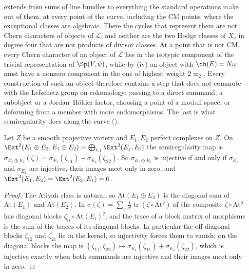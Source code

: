 \begin{remark}
\label{rem:leavel}
 extends  from sums of
line bundles to everything the standard operations make out of them, at every
point of the curve, including the CM points, where the exceptional classes
are algebraic. There the cycles that represent them are not Chern characters
of objects of $\mathcal{L}$, and neither are the two Hodge classes of $X_{c}$
in degree four that are not products of divisor classes. At a point that is
not CM, every Chern character of an object of $\mathcal{L}$ lies in the
isotypic component of the trivial representation of $\Sp(V,\psi)$, while by
(iv) an object with $\ch(E)=N\omega$ must have a
nonzero component in the one of highest weight $2\varpi_{2}$. Every
construction of such an object therefore contains a step that does not commute with the Lefschetz group on
cohomology: passing to a direct summand, a subobject or a Jordan--H\"older
factor, choosing a point of a moduli space, or deforming from a member with
more endomorphisms. The last is what semiregularity does along the curve
().
\end{remark}

\begin{lemma}\label{lem:semiregsum}
Let $Z$ be a smooth projective variety and $E_{1},E_{2}$ perfect complexes on
$Z$. On $\Ext^{2}(E_{1}\oplus E_{2},E_{1}\oplus E_{2})=\bigoplus_{i,j}
\Ext^{2}(E_{j},E_{i})$ the semiregularity map is
$\sigma_{E_{1}\oplus E_{2}}(\zeta)=\sigma_{E_{1}}(\zeta_{11})
+\sigma_{E_{2}}(\zeta_{22})$. So $\sigma_{E_{1}\oplus E_{2}}$ is injective if
and only if $\sigma_{E_{1}}$ and $\sigma_{E_{2}}$ are injective, their images
meet only in zero, and $\Ext^{2}(E_{1},E_{2})=\Ext^{2}(E_{2},E_{1})=0$.
\end{lemma}

\begin{proof}
The Atiyah class is natural, so $\mathrm{At}(E_{1}\oplus E_{2})$ is the
diagonal sum of $\mathrm{At}(E_{1})$ and $\mathrm{At}(E_{2})$. In
$\sigma(\zeta)=\sum_{q}\frac1{q!}\operatorname{tr}(\zeta\circ\mathrm{At}^{q})$
of \cite[Theorem~2.2]{paperII} the composite $\zeta\circ\mathrm{At}^{q}$ has diagonal blocks
$\zeta_{ii}\circ\mathrm{At}(E_{i})^{q}$, and the trace of a block matrix of
morphisms is the sum of the traces of its diagonal blocks. In particular the
off-diagonal blocks $\zeta_{12}$ and $\zeta_{21}$ lie in the kernel, so
injectivity forces them to vanish; on the diagonal blocks the map is
$(\zeta_{11},\zeta_{22})\mapsto\sigma_{E_{1}}(\zeta_{11})+\sigma_{E_{2}}
(\zeta_{22})$, which is injective exactly when both summands are injective
and their images meet only in zero.
\end{proof}

